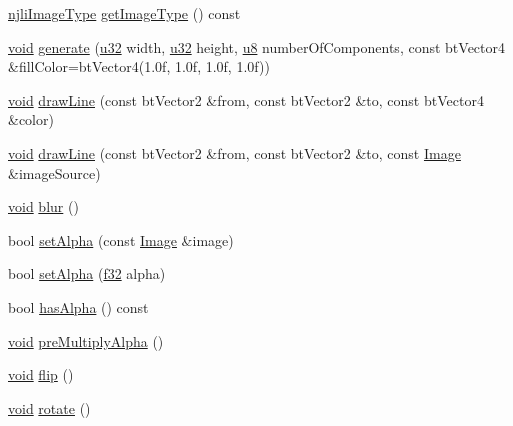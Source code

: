 \begin{DoxyCompactItemize}
\mbox{\hyperlink{namespacenjli_a709a24b63b768ce1cdff54f7f48d3c0b}{njli\+Image\+Type}} \mbox{\hyperlink{classnjli_1_1_image_a0aa8b4efae3b78e51e757b58c6c63b6b}{get\+Image\+Type}} () const
\item 
\mbox{\hyperlink{_thread_8h_af1e856da2e658414cb2456cb6f7ebc66}{void}} \mbox{\hyperlink{classnjli_1_1_image_abb8f6bfcdfd719dfe34d983157c352e5}{generate}} (\mbox{\hyperlink{_util_8h_a10e94b422ef0c20dcdec20d31a1f5049}{u32}} width, \mbox{\hyperlink{_util_8h_a10e94b422ef0c20dcdec20d31a1f5049}{u32}} height, \mbox{\hyperlink{_util_8h_aed742c436da53c1080638ce6ef7d13de}{u8}} number\+Of\+Components, const bt\+Vector4 \&fill\+Color=bt\+Vector4(1.\+0f, 1.\+0f, 1.\+0f, 1.\+0f))
\item 
\mbox{\hyperlink{_thread_8h_af1e856da2e658414cb2456cb6f7ebc66}{void}} \mbox{\hyperlink{classnjli_1_1_image_a1e15b3f6496df2fd30343d8b1d3953a6}{draw\+Line}} (const bt\+Vector2 \&from, const bt\+Vector2 \&to, const bt\+Vector4 \&color)
\item 
\mbox{\hyperlink{_thread_8h_af1e856da2e658414cb2456cb6f7ebc66}{void}} \mbox{\hyperlink{classnjli_1_1_image_a69d49e4cee4cddeae589f857f263a684}{draw\+Line}} (const bt\+Vector2 \&from, const bt\+Vector2 \&to, const \mbox{\hyperlink{classnjli_1_1_image}{Image}} \&image\+Source)
\item 
\mbox{\hyperlink{_thread_8h_af1e856da2e658414cb2456cb6f7ebc66}{void}} \mbox{\hyperlink{classnjli_1_1_image_af0f769d7188c8493a97d3a12c266f1d2}{blur}} ()
\item 
bool \mbox{\hyperlink{classnjli_1_1_image_ac0af5dfc7833f19b47aeff225506271b}{set\+Alpha}} (const \mbox{\hyperlink{classnjli_1_1_image}{Image}} \&image)
\item 
bool \mbox{\hyperlink{classnjli_1_1_image_abbf9c8b23419953dba0bc0ac4133aad9}{set\+Alpha}} (\mbox{\hyperlink{_util_8h_a5f6906312a689f27d70e9d086649d3fd}{f32}} alpha)
\item 
bool \mbox{\hyperlink{classnjli_1_1_image_a5bbc3edaead778489e987e0324744971}{has\+Alpha}} () const
\item 
\mbox{\hyperlink{_thread_8h_af1e856da2e658414cb2456cb6f7ebc66}{void}} \mbox{\hyperlink{classnjli_1_1_image_a5d36dc67447d4f30561baa36357ec223}{pre\+Multiply\+Alpha}} ()
\item 
\mbox{\hyperlink{_thread_8h_af1e856da2e658414cb2456cb6f7ebc66}{void}} \mbox{\hyperlink{classnjli_1_1_image_a16dd7ca0f260d8096beda930c3df4de4}{flip}} ()
\item 
\mbox{\hyperlink{_thread_8h_af1e856da2e658414cb2456cb6f7ebc66}{void}} \mbox{\hyperlink{classnjli_1_1_image_ab7123ed8ee5c43dbd9778cdac8323a86}{rotate}} ()

\end{DoxyCompactItemize}
